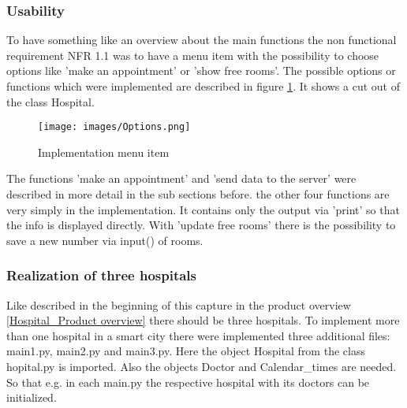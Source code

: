 \subsubsection{Usability}
To have something like an overview about the main functions the non functional requirement NFR 1.1 was to have a menu item with the possibility to choose options like 'make an appointment' or 'show free rooms'. The possible options or functions which were implemented are described in figure \ref{Options}. It shows a cut out of the class Hospital.

\begin{figure}[H]
\centering
\sidecaption
\texttt{[image: images/Options.png]}
\caption{Implementation menu item}
\label{Options}
\end{figure}

The functions 'make an appointment' and 'send data to the server' were described in more detail in the sub sections before. the other four functions are very simply in the implementation. It contains only the output via 'print' so that the info is displayed directly. With 'update free rooms' there is the possibility to save a new number via input() of rooms.

\subsubsection{Realization of three hospitals}
Like described in the beginning of this capture in the product overview \ref{Hospital_Product overview} there should be three hospitals. To implement more than one hospital in a smart city there were implemented three additional files: main1.py, main2.py and main3.py.
Here the object Hospital from the class hopital.py is imported. Also the objects Doctor and Calendar_times are needed. So that e.g. in each main.py the respective hospital with its doctors can be initialized.

